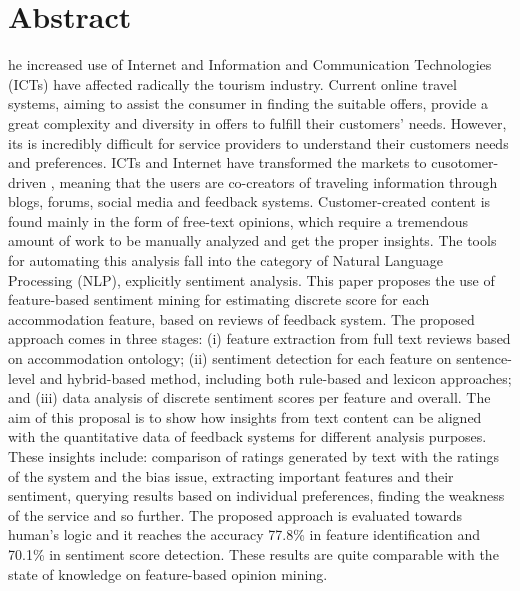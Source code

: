 %
%
%
\let\cleardoublepage\clearpage
\chapter{Abstract}
\begin{SingleSpace}

he increased use of Internet and Information and Communication Technologies (ICTs) have affected radically the tourism industry. Current online travel systems, aiming to assist the consumer in finding the suitable offers, provide a great complexity and diversity in offers to fulfill their customers' needs. However, its is incredibly difficult for service providers to understand their customers needs and preferences. ICTs and Internet have transformed the markets to cusotomer-driven \cite{buhalis2011tourism}, meaning that the users are co-creators of traveling information through blogs, forums, social media and feedback systems.  Customer-created content is found mainly in the form of free-text opinions, which require a tremendous amount of work to be manually analyzed and get the proper insights. The tools for automating this analysis fall into the category of Natural Language Processing (NLP), explicitly sentiment analysis. 
This paper proposes the use of feature-based sentiment mining for estimating discrete score for each accommodation feature, based on reviews of feedback system. The proposed approach comes in three stages: (i) feature extraction from full text reviews based on accommodation ontology; (ii) sentiment detection for each feature on sentence-level and hybrid-based method, including both rule-based and lexicon approaches; and (iii) data analysis of discrete sentiment scores per feature and overall. The aim of this proposal is to show how insights from text content can be aligned with the quantitative data of feedback systems for different analysis purposes. These insights include: comparison of ratings generated by text with the ratings of the system and the bias issue, extracting important features and their sentiment, querying results based on individual preferences, finding the weakness of the service and so further. The proposed approach is evaluated towards human's logic and it reaches the accuracy 77.8\% in feature identification and 70.1\% in sentiment score detection. These results are quite comparable with the state of knowledge on feature-based opinion mining.
\end{SingleSpace}
\clearpage